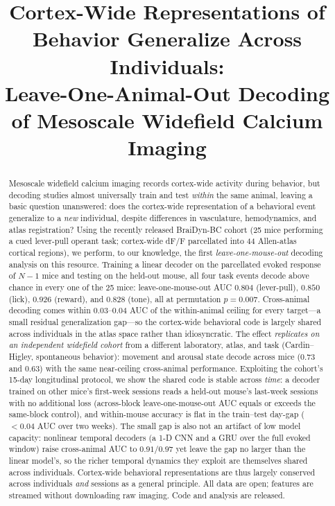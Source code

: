 \documentclass[conference]{IEEEtran}
\begin{document}
\title{Cortex-Wide Representations of Behavior Generalize Across Individuals:\\
Leave-One-Animal-Out Decoding of Mesoscale Widefield Calcium Imaging}
\author{}
\maketitle

\begin{abstract}
Mesoscale widefield calcium imaging records cortex-wide activity during behavior, but
decoding studies almost universally train and test \emph{within} the same animal, leaving a
basic question unanswered: does the cortex-wide representation of a behavioral event
generalize to a \emph{new} individual, despite differences in vasculature, hemodynamics, and
atlas registration? Using the recently released BraiDyn-BC cohort (25 mice performing a cued
lever-pull operant task; cortex-wide dF/F parcellated into 44 Allen-atlas cortical regions),
we perform, to our knowledge, the first \emph{leave-one-mouse-out} decoding analysis on this
resource. Training a linear decoder on the parcellated evoked response of $N-1$ mice and
testing on the held-out mouse, all four task events decode above chance in every one of the 25
mice: leave-one-mouse-out AUC $0.804$ (lever-pull), $0.850$ (lick), $0.926$ (reward), and
$0.828$ (tone), all at permutation $p=0.007$. Cross-animal decoding comes within
$0.03$--$0.04$ AUC of the within-animal ceiling for every target---a small residual
generalization gap---so the cortex-wide behavioral code is largely shared across individuals in
the atlas space rather than idiosyncratic. The effect \emph{replicates on an independent
widefield cohort} from a different laboratory, atlas, and task (Cardin--Higley, spontaneous
behavior): movement and arousal state decode across mice ($0.73$ and $0.63$) with the same
near-ceiling cross-animal performance. Exploiting the cohort's 15-day longitudinal protocol, we
show the shared code is stable across \emph{time}: a decoder trained on other mice's first-week
sessions reads a held-out mouse's last-week sessions with no additional loss (across-block
leave-one-mouse-out AUC equals or exceeds the same-block control), and within-mouse accuracy is
flat in the train--test day-gap ($<0.04$ AUC over two weeks). The small gap is also not an
artifact of low model capacity: nonlinear temporal decoders (a 1-D CNN and a GRU over the full
evoked window) raise cross-animal AUC to $0.91$/$0.97$ yet leave the gap no larger than the
linear model's, so the richer temporal dynamics they exploit are themselves shared across
individuals. Cortex-wide behavioral representations are thus largely conserved across
individuals \emph{and} sessions as a general
principle. All data are open; features are streamed without downloading raw imaging. Code and
analysis are released.
\end{abstract}
\end{document}
